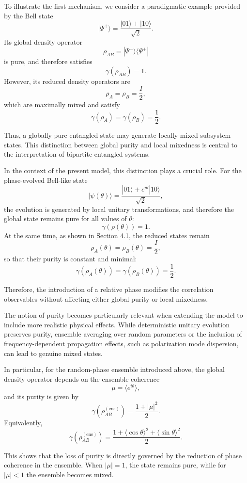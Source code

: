 \documentclass[a4paper]{article}
\begin{document}
To illustrate the first mechanism, we consider a paradigmatic example provided by the Bell state
\[
|\Psi^+\rangle = \frac{|01\rangle + |10\rangle}{\sqrt{2}}.
\]
Its global density operator
\[
\rho_{AB} = |\Psi^+\rangle \langle \Psi^+|
\]
is pure, and therefore satisfies
\[
\gamma(\rho_{AB}) = 1.
\]
However, its reduced density operators are
\[
\rho_A = \rho_B = \frac{I}{2},
\]
which are maximally mixed and satisfy
\[
\gamma(\rho_A) = \gamma(\rho_B) = \frac{1}{2}.
\]

Thus, a globally pure entangled state may generate locally mixed subsystem states. This distinction between global purity and local mixedness is central to the interpretation of bipartite entangled systems.

\medskip

In the context of the present model, this distinction plays a crucial role. For the phase-evolved Bell-like state
\[
|\psi(\theta)\rangle = \frac{|01\rangle + e^{i\theta}|10\rangle}{\sqrt{2}},
\]
the evolution is generated by local unitary transformations, and therefore the global state remains pure for all values of $\theta$:
\[
\gamma(\rho(\theta)) = 1.
\]
At the same time, as shown in Section 4.1, the reduced states remain
\[
\rho_A(\theta) = \rho_B(\theta) = \frac{I}{2},
\]
so that their purity is constant and minimal:
\[
\gamma(\rho_A(\theta)) = \gamma(\rho_B(\theta)) = \frac{1}{2}.
\]

Therefore, the introduction of a relative phase modifies the correlation observables without affecting either global purity or local mixedness.

\medskip

The notion of purity becomes particularly relevant when extending the model to include more realistic physical effects. 
While deterministic unitary evolution preserves purity, ensemble averaging over random parameters or the inclusion of frequency-dependent propagation effects, such as polarization mode dispersion, can lead to genuine mixed states. 

In particular, for the random-phase ensemble introduced above, the global density operator depends on the ensemble coherence
\[
\mu = \langle e^{i\theta} \rangle,
\]
and its purity is given by
\[
\gamma\!\left(\rho_{AB}^{(\mathrm{ens})}\right)
=
\frac{1 + |\mu|^2}{2}.
\]
Equivalently,
\[
\gamma\!\left(\rho_{AB}^{(\mathrm{ens})}\right)
=
\frac{1 + \langle \cos\theta \rangle^2 + \langle \sin\theta \rangle^2}{2}.
\]

This shows that the loss of purity is directly governed by the reduction of phase coherence in the ensemble. When $|\mu|=1$, the state remains pure, while for $|\mu|<1$ the ensemble becomes mixed.
\end{document}
